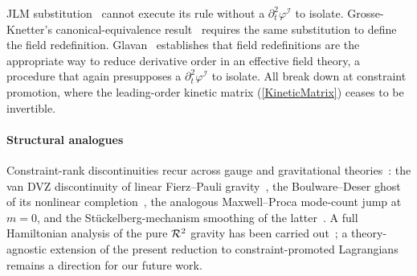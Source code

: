 JLM substitution~\cite{jaen1986reduction} cannot execute its rule
without a $\partial_t^2\varphi^{\mathcal{I}}$ to isolate. Grosse-Knetter's
canonical-equivalence result~\cite{Grosse-Knetter:1993tae} requires the same
substitution to define the field redefinition. Glavan~\cite{Glavan2018} establishes
that field redefinitions are the appropriate way to reduce derivative order in an
effective field theory, a procedure that again presupposes a $\partial_t^2\varphi^{\mathcal{I}}$ to isolate.
All break down at constraint promotion, where the
leading-order kinetic matrix (\cref{KineticMatrix}) ceases to be invertible.

%

\paragraph*{Structural analogues}
Constraint-rank discontinuities recur across gauge and gravitational
theories~\cite{deRham2014,hinterbichler2012theoretical}: the
van DVZ discontinuity of linear Fierz--Pauli
gravity~\cite{vandam1970massive,zakharov1970linearized}, the Boulware--Deser ghost
of its nonlinear completion~\cite{boulware1972gravitation}, the analogous
Maxwell--Proca mode-count jump at $m=0$, and the St\"uckelberg-mechanism smoothing of the
latter~\cite{RueggRuizAltaba2003}. A full Hamiltonian analysis of the
pure $\MAGF{^2}$ gravity has been carried out~\cite{barker2024r2}; a theory-agnostic
extension of the present reduction to constraint-promoted Lagrangians remains a
direction for our future work.


